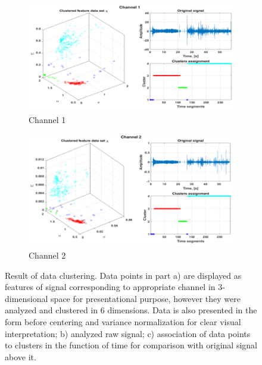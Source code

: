 \documentclass[10pt]{article}
\begin{document}
\begin{figure}[!ht]
  \centering
  \begin{subfigure}[b]{0.49\textwidth}
      \centering
      \includegraphics[width=\textwidth]{wykresy/out1}
      \caption{Channel 1}
      \label{fig:out1}
  \end{subfigure}
  \begin{subfigure}[b]{0.49\textwidth}
      \centering
		\includegraphics[width=\textwidth]{wykresy/out2}
        \caption{Channel 2}
    \label{fig:out2}
  \end{subfigure}
  \caption{Result of data clustering. Data points in part a) are displayed as features of signal corresponding to appropriate channel in 3-dimensional space for presentational purpose, however they were analyzed and clustered in 6 dimensions. Data is also presented in the form before centering and variance normalization for clear visual interpretation; b) analyzed raw signal; c) association of data points to clusters in the function of time for comparison with original signal above it.}
  \label{fig:out}
\end{figure}
\end{document}
